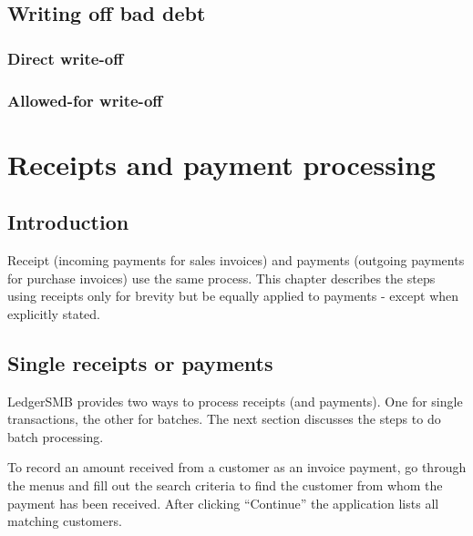 \section{Writing off bad debt}
\label{sec-business-processes-credit-risk-bad-debt-write-off}

\subsection{Direct write-off}
\label{sec-business-processes-credit-risk-bad-debt-direct-write-off}

\subsection{Allowed-for write-off}
\label{sec-business-processes-credit-risk-bad-debt-allowed-write-off}

\chapter{Receipts and payment processing}
\label{cha-business-processes-payment-processing}

\section{Introduction}
\label{sec-business-processes-payment-processing-introduction}

Receipt (incoming payments for sales invoices) and payments (outgoing payments
for purchase invoices) use the same process. This chapter describes the steps
using receipts only for brevity but be equally applied to payments - except
when explicitly stated.

\section{Single receipts or payments}
\label{sec-business-processes-payment-processing-single-payments}

LedgerSMB provides two ways to process receipts (and payments). One for single transactions,
the other for batches. The next section discusses the steps to do batch processing.

To record an amount received from a \gls{customer} as an invoice payment, go through the menus
 and fill out the search criteria to find the customer from whom
the payment has been received. After clicking ``Continue'' the application lists all matching
customers.

